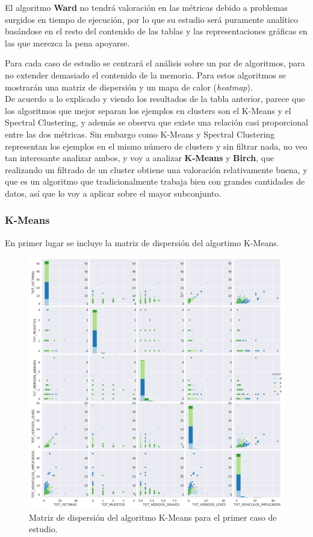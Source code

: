 	El algoritmo \textbf{Ward} no tendrá valoración en las métricas debido a problemas surgidos en tiempo de ejecución, por lo que su estudio será puramente analítico basándose en el resto del contenido de las tablas y las representaciones gráficas en las que merezca la pena apoyarse.

	Para cada caso de estudio se centrará el análisis sobre un par de algoritmos, para no extender demasiado el contenido de la memoria. Para estos algoritmos se mostrarán una matriz de dispersión y un mapa de calor (\textit{heatmap}).\\

	De acuerdo a lo explicado y viendo los resultados de la tabla anterior, parece que los algoritmos que mejor separan los ejemplos en clusters son el K-Means y el Spectral Clustering, y además se observa que existe una relación casi proporcional entre las dos métricas. Sin embargo como K-Means y Spectral Clustering representan los ejemplos en el mismo número de clusters y sin filtrar nada, no veo tan interesante analizar ambos, y voy a analizar \textbf{K-Means} y \textbf{Birch}, que realizando un filtrado de un cluster obtiene una valoración relativamente buena, y que es un algoritmo que tradicionalmente trabaja bien con grandes cantidades de datos, así que lo voy a aplicar sobre el mayor subconjunto.

	\subsubsection{K-Means}
	En primer lugar se incluye la matriz de dispersión del algortimo K-Means.
	
	\begin{figure}[H]
		\centering
		\includegraphics[scale=0.5]{plots/K-Means-HighwayAccidents-ScatterMatrix.png}
		\caption{Matriz de dispersión del algoritmo K-Means para el primer caso de estudio.}
	\end{figure}

